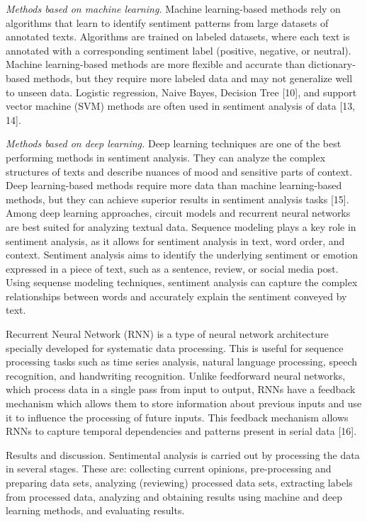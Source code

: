 \emph{Methods based on machine learning.} Machine learning-based methods
rely on algorithms that learn to identify sentiment patterns from large
datasets of annotated texts. Algorithms are trained on labeled datasets,
where each text is annotated with a corresponding sentiment label
(positive, negative, or neutral). Machine learning-based methods are
more flexible and accurate than dictionary-based methods, but they
require more labeled data and may not generalize well to unseen data.
Logistic regression, Naive Bayes, Decision Tree {[}10{]}, and support
vector machine (SVM) methods are often used in sentiment analysis of
data {[}13, 14{]}.

\emph{Methods based on deep learning.} Deep learning techniques are one
of the best performing methods in sentiment analysis. They can analyze
the complex structures of texts and describe nuances of mood and
sensitive parts of context. Deep learning-based methods require more
data than machine learning-based methods, but they can achieve superior
results in sentiment analysis tasks {[}15{]}. Among deep learning
approaches, circuit models and recurrent neural networks are best suited
for analyzing textual data. Sequence modeling plays a key role in
sentiment analysis, as it allows for sentiment analysis in text, word
order, and context. Sentiment analysis aims to identify the underlying
sentiment or emotion expressed in a piece of text, such as a sentence,
review, or social media post. Using sequense modeling techniques,
sentiment analysis can capture the complex relationships between words
and accurately explain the sentiment conveyed by text.

Recurrent Neural Network (RNN) is a type of neural network architecture
specially developed for systematic data processing. This is useful for
sequence processing tasks such as time series analysis, natural language
processing, speech recognition, and handwriting recognition. Unlike
feedforward neural networks, which process data in a single pass from
input to output, RNNs have a feedback mechanism which allows them to
store information about previous inputs and use it to influence the
processing of future inputs. This feedback mechanism allows RNNs to
capture temporal dependencies and patterns present in serial data
{[}16{]}.

Results and discussion. Sentimental analysis is carried out by
processing the data in several stages. These are: collecting current
opinions, pre-processing and preparing data sets, analyzing (reviewing)
processed data sets, extracting labels from processed data, analyzing
and obtaining results using machine and deep learning methods, and
evaluating results.


